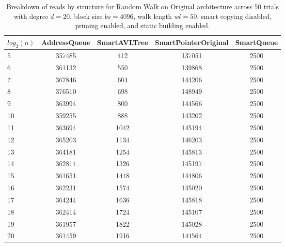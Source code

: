 \begin{table}[]
\centering
\begin{tabular}{|l|c|c|c|c|}
$log_2(n)$ & AddressQueue & SmartAVLTree & SmartPointerOriginal & SmartQueue \\ \hline
5 & 357485 & 412 & 137051 & 2500 \\ \hline
6 & 361132 & 550 & 139868 & 2500 \\ \hline
7 & 367846 & 604 & 144206 & 2500 \\ \hline
8 & 376510 & 698 & 148949 & 2500 \\ \hline
9 & 363994 & 800 & 144566 & 2500 \\ \hline
10 & 359255 & 888 & 143202 & 2500 \\ \hline
11 & 363694 & 1042 & 145194 & 2500 \\ \hline
12 & 365203 & 1134 & 146203 & 2500 \\ \hline
13 & 364181 & 1254 & 145813 & 2500 \\ \hline
14 & 362814 & 1326 & 145197 & 2500 \\ \hline
15 & 361651 & 1448 & 144806 & 2500 \\ \hline
16 & 362231 & 1574 & 145020 & 2500 \\ \hline
17 & 364244 & 1636 & 145818 & 2500 \\ \hline
18 & 362414 & 1724 & 145107 & 2500 \\ \hline
19 & 361957 & 1822 & 145028 & 2500 \\ \hline
20 & 361459 & 1916 & 144564 & 2500 \\ \hline
\end{tabular}
\caption{Breakdown of reads by structure for Random Walk on Original architecture across 50 trials with degree $d=20$, block size $bs=4096$, walk length $wl=50$, smart copying disabled, priming enabled, and static building enabled.}
    \label{tab:reads_by_structure_rw_d20_bs4096_trials50_copiesfalse_primetrue_staticinsertiontrue_wl50_ptoriginal_movefalse}
\end{table}


